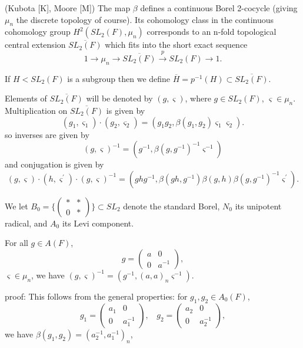 \begin{lemma}
(Kubota [K], Moore [M]) The map $\beta $ defines a continuous Borel
2-cocycle (giving $\mu _n$ the discrete topology of course). Its cohomology
class in the continuous cohomology group $H^2(SL_2(F),\mu _n)$ corresponds
to an n-fold topological central extension $\overline{SL_2(F)}$ which fits
into the short exact sequence 
\[
1\rightarrow \mu _n\rightarrow \overline{SL_2(F)}\stackrel{p}{\rightarrow }%
SL_2(F)\rightarrow 1.
\]
\end{lemma}

If $H<SL_2(F)$ is a subgroup then we define $\overline{H}=p^{-1}(H)\subset 
\overline{SL_2(F)}$.

Elements of $\overline{SL_2(F)}$ will be denoted by $(g,\varsigma )$, where $%
g\in SL_2(F)$, $\varsigma \in \mu _n$. Multiplication on $\overline{SL_2(F)}$
is given by 
\begin{equation}
(g_1,\varsigma _1)\cdot (g_2,\varsigma _2)=(g_1g_2,\beta (g_1,g_2)\varsigma
_1\varsigma _2).
\end{equation}
so inverses are given by 
\begin{equation}
(g,\varsigma )^{-1}=(g^{-1},\beta (g,g^{-1})^{-1}\varsigma ^{-1})
\end{equation}
and conjugation is given by 
\begin{equation}
(g,\varsigma )\cdot (h,\varsigma ^{\prime })\cdot (g,\varsigma
)^{-1}=(ghg^{-1},\beta (gh,g^{-1})\beta (g,h)\beta (g,g^{-1})^{-1}\varsigma
^{\prime }).
\end{equation}

We let $B_0=\{\left( 
\begin{array}{cc}
\ast & * \\ 
0 & *
\end{array}
\right) \}\subset SL_2$ denote the standard Borel, $N_0$ its unipotent
radical, and $A_0$ its Levi component.

\begin{lemma}
For all $g\in A(F)$, 
\[
g=\left( 
\begin{array}{cc}
a & 0 \\ 
0 & a^{-1}
\end{array}
\right) ,
\]
$\varsigma \in \mu _n$, we have $(g,\varsigma
)^{-1}=(g^{-1},(a,a)_n\varsigma ^{-1})$.
\end{lemma}

{\sf proof}: This follows from the general properties: for $g_1,g_2\in
A_0(F) $, 
\[
g_1=\left( 
\begin{array}{cc}
a_1 & 0 \\ 
0 & a_1^{-1}
\end{array}
\right) ,\ \ \ \ g_2=\left( 
\begin{array}{cc}
a_2 & 0 \\ 
0 & a_2^{-1}
\end{array}
\right) , 
\]
we have $\beta (g_1,g_2)=(a_2^{-1},a_1^{-1})_n$,

